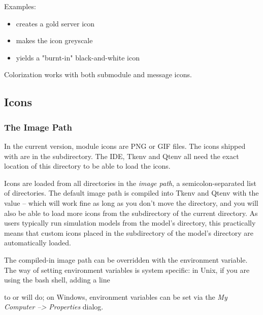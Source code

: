 Examples:

\begin{itemize}
  \item {} creates a gold server icon
  \item {} makes the icon greyscale
  \item {} yields a "burnt-in" black-and-white icon
\end{itemize}

Colorization works with both submodule and message icons.


\subsection{Icons}
\label{sec:ch-graphics:icon-library}

\subsubsection{The Image Path}

In the current {\opp} version, module icons are PNG or GIF files. The icons shipped
with {\opp} are in the  subdirectory. The IDE, Tkenv and Qtenv all
need the exact location of this directory to be able to load the icons.

Icons are loaded from all directories in the \textit{image path},
a semicolon-separated list of directories.
The default image path is compiled into Tkenv and Qtenv with the value
 -- which will work fine
as long as you don't move the directory, and you will also be able to
load more icons from the  subdirectory of the current
directory. As users typically run simulation models from the model's
directory, this practically means that custom icons placed in the
 subdirectory of the model's directory are automatically
loaded.

The compiled-in image path can be overridden with the 
environment variable. The way of setting environment variables is system
specific: in Unix, if you are using the bash shell, adding a line


to  or  will do;
on Windows, environment variables can be set via the \textit{My Computer --> Properties} dialog.

